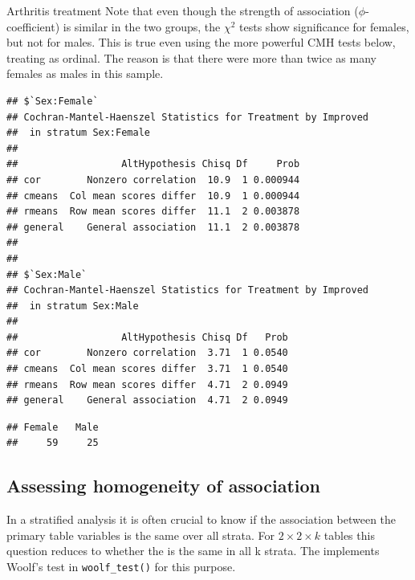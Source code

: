 \documentclass[11pt]{book}
\renewenvironment{knitrout}{\small\renewcommand{\baselinestretch}{.85}}{} %
\begin{document}
\begin{Example}[arthrit3]{Arthritis treatment}
Note that even though the strength of association ($\phi$-coefficient)
is similar in the two groups, the $\chi^2$ tests show
significance for females, but not for males.
This is true even using the more powerful CMH tests below, treating
 as ordinal.  The reason is that there were more than
twice as many females as males in this sample.
\begin{knitrout}
\color{fgcolor}\begin{kframe}
\begin{alltt}
\end{alltt}
\begin{verbatim}
## $`Sex:Female`
## Cochran-Mantel-Haenszel Statistics for Treatment by Improved 
## 	in stratum Sex:Female 
## 
##                  AltHypothesis Chisq Df     Prob
## cor        Nonzero correlation  10.9  1 0.000944
## cmeans  Col mean scores differ  10.9  1 0.000944
## rmeans  Row mean scores differ  11.1  2 0.003878
## general    General association  11.1  2 0.003878
## 
## 
## $`Sex:Male`
## Cochran-Mantel-Haenszel Statistics for Treatment by Improved 
## 	in stratum Sex:Male 
## 
##                  AltHypothesis Chisq Df   Prob
## cor        Nonzero correlation  3.71  1 0.0540
## cmeans  Col mean scores differ  3.71  1 0.0540
## rmeans  Row mean scores differ  4.71  2 0.0949
## general    General association  4.71  2 0.0949
\end{verbatim}
\begin{alltt}
 
\end{alltt}
\begin{verbatim}
## Female   Male 
##     59     25
\end{verbatim}
\end{kframe}
\end{knitrout}

\end{Example}

\subsection{Assessing homogeneity of association}\label{sec:twoway-homog}
In a stratified analysis
it is often  crucial to know if the association between the
primary table variables is the same over all strata.  For 
\(2 \times  2 \times k\) tables this question reduces to whether the  is
the same in all k strata. The  implements 
Woolf's test \citep{Woolf:1995} in \verb|woolf_test()|
for this purpose.
\end{document}
